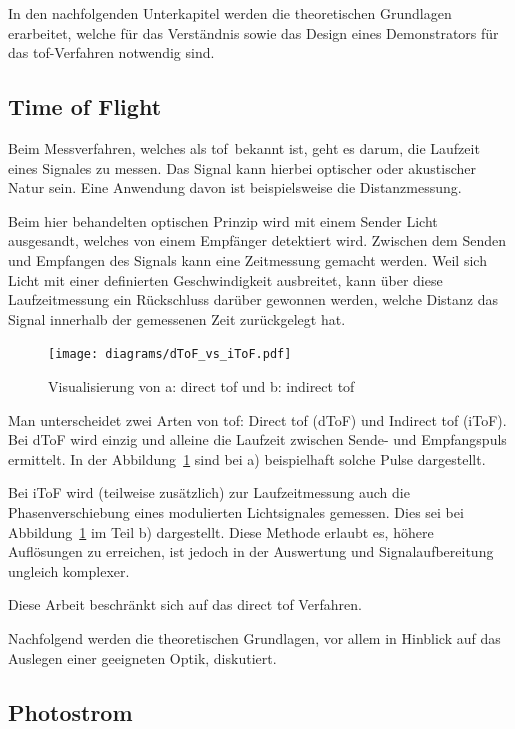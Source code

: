 In den nachfolgenden Unterkapitel werden die theoretischen Grundlagen erarbeitet, welche für das Verständnis sowie das
Design eines Demonstrators für das \acrshort{tof}-Verfahren notwendig sind.

\subsection{Time of Flight}

Beim Messverfahren, welches als \dq \acrlong{tof}\dq\ bekannt ist, geht es darum, die Laufzeit eines Signales zu messen.
Das Signal kann hierbei optischer oder akustischer Natur sein. Eine Anwendung davon ist beispielsweise die Distanzmessung.

Beim hier behandelten optischen Prinzip wird mit einem Sender Licht ausgesandt, welches von einem Empfänger detektiert wird.
Zwischen dem Senden und Empfangen des Signals kann eine Zeitmessung gemacht werden. Weil sich Licht mit einer definierten
Geschwindigkeit ausbreitet, kann über diese Laufzeitmessung ein Rückschluss darüber gewonnen werden, welche Distanz
das Signal innerhalb der gemessenen Zeit zurückgelegt hat.

\begin{figure}[H]
    \centering
    \texttt{[image: diagrams/dToF\_vs\_iToF.pdf]}
    \caption{Visualisierung von a: direct \acrshort{tof} und b: indirect \acrshort{tof}}\label{fig:dtof_vs_itof}
\end{figure}

Man unterscheidet zwei Arten von \acrshort{tof}: Direct \acrshort{tof} (dToF) und Indirect \acrshort{tof} (iToF). Bei dToF
wird einzig und alleine die Laufzeit zwischen Sende- und Empfangspuls ermittelt. In der Abbildung~\ref{fig:dtof_vs_itof}
sind bei a) beispielhaft solche Pulse dargestellt.

Bei iToF wird (teilweise zusätzlich) zur Laufzeitmessung auch die Phasenverschiebung eines modulierten Lichtsignales gemessen.
Dies sei bei Abbildung~\ref{fig:dtof_vs_itof} im Teil b) dargestellt. Diese Methode erlaubt es, höhere Auflösungen zu
erreichen, ist jedoch in der Auswertung und Signalaufbereitung ungleich komplexer.

Diese Arbeit beschränkt sich auf das direct \acrshort{tof} Verfahren.

Nachfolgend werden die theoretischen Grundlagen, vor allem in Hinblick auf das Auslegen einer geeigneten Optik, diskutiert.

\pagebreak

\subsection{Photostrom}

